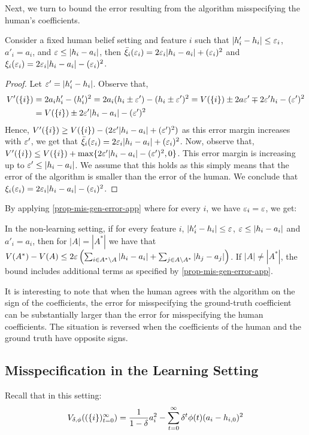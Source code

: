 Next, we turn to bound the error resulting from the algorithm misspecifying the human's coefficients.
\begin{observation} \label{obs-err-h-static}
Consider a fixed human belief setting and feature $i$ such that $|h'_i-h_i|\leq \varepsilon_i$, $a'_i= a_i$, and $\varepsilon \leq |h_i-a_i|$, then $\bar \xi_i(\varepsilon_i)=2\varepsilon_i|h_i-a_i|+(\varepsilon_i)^2$ and $\xi_i(\varepsilon_i)=2\varepsilon_i|h_i-a_i|-(\varepsilon_i)^2$.
\end{observation}
\begin{proof}
Let $\varepsilon' = |h'_i-h_i|$. Observe that,
\begin{align*}
V'(\{i\}) &= 2a_ih'_i-(h'_i)^2 = 2a_i(h_i \pm \varepsilon')-(h_i\pm \varepsilon')^2 = V(\{i\}) \pm 2a\varepsilon' \mp 2\varepsilon' h_i - (\varepsilon')^2 \\
&= V(\{i\}) \pm 2\varepsilon'|h_i-a_i|-(\varepsilon')^2
\end{align*}
Hence, $V'(\{i\}) \geq V(\{i\}) -(2\varepsilon'|h_i-a_i|+(\varepsilon')^2)$ as this error margin increases with $\varepsilon'$, we get that $\bar \xi_i(\varepsilon_i)=2\varepsilon_i|h_i-a_i|+(\varepsilon_i)^2$. Now, observe that, $V'(\{i\}) \leq V(\{i\}) + \max\{2\varepsilon'|h_i-a_i|-(\varepsilon')^2,0\}$. This error margin is increasing up to $\varepsilon' \leq |h_i-a_i|$. We assume that this holds as this simply means that the error of the algorithm is smaller than the error of the human. We conclude that $\xi_i(\varepsilon_i)=2\varepsilon_i|h_i-a_i|-(\varepsilon_i)^2$.
\end{proof}
By applying \cref{prop-mis-gen-error-app} where for every $i$, we have $\varepsilon_i=\varepsilon$, we get:
\begin{corollary}
In the non-learning setting, if for every feature $i$, $|h'_i-h_i|\leq \varepsilon$, $\varepsilon \leq |h_i-a_i|$ and $a'_i= a_i$, then for $|A|=|A^*|$ we have that $V(A^*)-V(A) \leq   2\varepsilon \left( \sum_{i \in A^* \setminus A} |h_i-a_i| +  \sum_{j \in A \setminus A^*} |h_j-a_j| \right)$. If $|A|\neq|A^*|$, the bound includes additional terms as specified by \cref{prop-mis-gen-error-app}.
\end{corollary}

It is interesting to note that when the human agrees with the algorithm on the sign of the coefficients, the error for misspecifying the ground-truth coefficient can be substantially larger than the error for misspecifying the human coefficients. The situation is reversed when the coefficients of the human and the ground truth have  opposite signs. 

\subsection{Misspecification in the Learning Setting}
Recall that in this setting:
 \begin{align*} 
 V_{\delta,\phi}((\{i\})_{t=0}^\infty) =   \frac{1}{1-\delta}a_i^2 - \sum_{t=0}^\infty \delta^t \phi(t)(a_i-h_{i,0})^2
 \end{align*}

